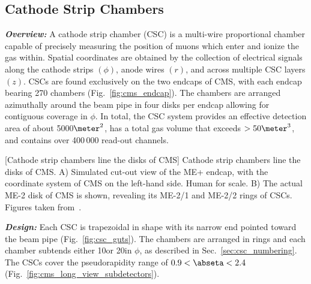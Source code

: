 \subsection{Cathode Strip Chambers}
\label{sec:csc} 
\textit{\textbf{Overview:}}
A cathode strip chamber (CSC) is a multi-wire proportional chamber capable of precisely measuring the position of muons which enter and ionize the gas within.
Spatial coordinates are obtained by the collection of electrical signals along the cathode strips $(\phi)$, anode wires $(r)$, and across multiple CSC layers $(z)$.
CSCs are found exclusively on the two endcaps of CMS, with each endcap bearing 270 chambers (Fig.~\ref{fig:cms_endcap}).
The chambers are arranged azimuthally around the beam pipe in four disks per endcap allowing for contiguous coverage in $\phi$.
In total, the CSC system provides an effective detection area of about 5000$\meter^2$, has a total gas volume that exceeds $> 50\meter^{3}$, and contains over 400\,000 read-out channels.
\begin{multiFigure}
    \centering
        [Cathode strip chambers line the disks of CMS]
        {Cathode strip chambers line the disks of CMS.
        \;A) Simulated cut-out view of the ME+ endcap, with the coordinate system of CMS on the left-hand side.
        Human for scale.
        \;B) The actual ME-2 disk of CMS is shown, revealing its ME-2/1 and ME-2/2 rings of CSCs.
        Figures taken from~\cite{PhysRevLett.114.191803}. %
        }
    \label{fig:cms_endcap}
\end{multiFigure}
\textit{\textbf{Design:}}
Each CSC is trapezoidal in shape with its narrow end pointed toward the beam pipe (Fig.~\ref{fig:csc_guts}).
The chambers are arranged in rings and each chamber subtends either 10\degrees or 20\degrees in $\phi$, as described in Sec.~\ref{sec:csc_numbering}.
The CSCs cover the pseudorapidity range of $0.9 < \abseta < 2.4$ (Fig.~\ref{fig:cms_long_view_subdetectors}).

